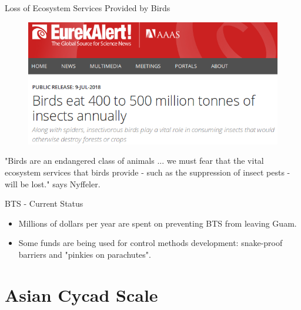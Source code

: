 \documentclass[]{beamer}
\begin{document}
\begin{frame}{Loss of Ecosystem Services Provided by Birds}
	\begin{figure}
		\includegraphics[height=0.5\textheight]{eureka-bird-loss.png}
	\end{figure}
"Birds are an endangered class of animals ... we must fear that the vital ecosystem services that birds provide - such as the suppression of insect pests - will be lost." says Nyffeler.
\end{frame}

\begin{frame}{BTS - Current Status}
	\begin{itemize}
		\item Millions of dollars per year are spent on preventing BTS from leaving Guam.
		\item Some funds are being used for control methods development: snake-proof barriers and "pinkies on parachutes".
	\end{itemize}
\end{frame}

\section{Asian Cycad Scale}
\end{document}
